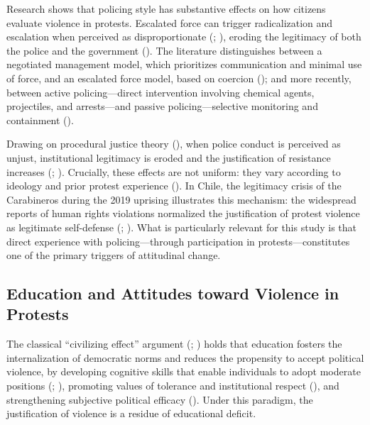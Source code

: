 \documentclass[
  13pt,
]{article}
\begin{document}
Research shows that policing style has substantive effects on how
citizens evaluate violence in protests. Escalated force can trigger
radicalization and escalation when perceived as disproportionate
(;
), eroding
the legitimacy of both the police and the government
(). The
literature distinguishes between a negotiated management model, which
prioritizes communication and minimal use of force, and an escalated
force model, based on coercion
(); and
more recently, between active policing---direct intervention involving
chemical agents, projectiles, and arrests---and passive
policing---selective monitoring and containment
().

Drawing on procedural justice theory
(), when police
conduct is perceived as unjust, institutional legitimacy is eroded and
the justification of resistance increases
(;
). Crucially,
these effects are not uniform: they vary according to ideology and prior
protest experience (). In Chile, the legitimacy crisis of the
Carabineros during the 2019 uprising illustrates this mechanism: the
widespread reports of human rights violations normalized the
justification of protest violence as legitimate self-defense
(;
). What is particularly relevant for this study is that
direct experience with policing---through participation in
protests---constitutes one of the primary triggers of attitudinal
change.

\subsection{Education and Attitudes toward Violence in
Protests}\label{education-and-attitudes-toward-violence-in-protests}

The classical ``civilizing effect'' argument
(;
) holds that
education fosters the internalization of democratic norms and reduces
the propensity to accept political violence, by developing cognitive
skills that enable individuals to adopt moderate positions
(;
), promoting values
of tolerance and institutional respect
(), and strengthening
subjective political efficacy
(). Under
this paradigm, the justification of violence is a residue of educational
deficit.
\end{document}
